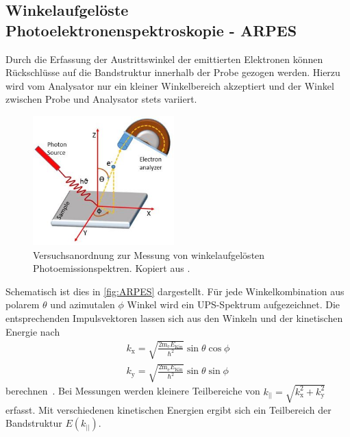         \subsection{Winkelaufgelöste Photoelektronenspektroskopie - ARPES} \label{sec:ARPES}
            Durch die Erfassung der Austrittswinkel der emittierten Elektronen können Rückschlüsse auf die Bandstruktur innerhalb der Probe gezogen werden.
            Hierzu wird vom Analysator nur ein kleiner Winkelbereich akzeptiert und der Winkel zwischen Probe und Analysator stets variiert.
            \begin{figure}
                \centering
                \includegraphics[height=5cm]{ARPES.jpg}
                \caption{Versuchsanordnung zur Messung von winkelaufgelösten Photoemissionspektren. Kopiert aus \cite{ARPES}.}
                \label{fig:ARPES}
            \end{figure}
            Schematisch ist dies in \autoref{fig:ARPES} dargestellt.
            Für jede Winkelkombination aus polarem $\theta$ und azimutalen $\phi$ Winkel wird ein UPS-Spektrum aufgezeichnet.
            Die entsprechenden Impulsvektoren lassen sich aus den Winkeln und der kinetischen Energie nach
            \begin{gather}
                k_\text{x} = \sqrt{\frac{2 \text{m}_\text{e} E_\text{Kin}}{\hbar^2}} \sin\theta \cos\phi \\
                k_\text{y} = \sqrt{\frac{2 \text{m}_\text{e} E_\text{Kin}}{\hbar^2}} \sin\theta \sin\phi
            \end{gather}
            berechnen~\cite{MM_4}.
            Bei Messungen werden kleinere Teilbereiche von $k_\text{||} = \sqrt{k_\text{x}^2 + k_\text{y}^2}$ erfasst.
            Mit verschiedenen kinetischen Energien ergibt sich ein Teilbereich der Bandstruktur $E(k_\text{||})$.
